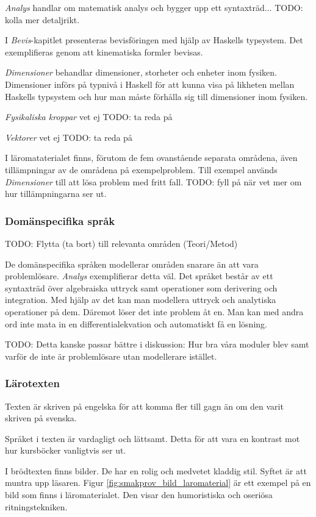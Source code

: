 \begin{binge}
\textit{Analys} handlar om matematisk analys och bygger upp ett syntaxträd...
TODO: kolla mer detaljrikt.

I \textit{Bevis}-kapitlet presenteras bevisföringen med hjälp av Haskells
typsystem. Det exemplifieras genom att kinematiska formler bevisas.

\textit{Dimensioner} behandlar dimensioner, storheter och enheter inom fysiken.
Dimensioner införs på typnivå i Haskell för att kunna visa på likheten mellan
Haskells typsystem och hur man måste förhålla sig till dimensioner inom
fysiken.

\textit{Fysikaliska kroppar} vet ej TODO: ta reda på

\textit{Vektorer} vet ej TODO: ta reda på

I läromataterialet finns, förutom de fem ovanstående separata områdena, även tillämpningar av de områdena på exempelproblem. Till exempel används \textit{Dimensioner} till att lösa problem med fritt fall. TODO: fyll på när vet mer om hur tillämpningarna ser ut.

\subsubsection{Domänspecifika språk}
TODO: Flytta (ta bort) till relevanta områden (Teori/Metod)

De domänspecifika språken modellerar områden snarare än att vara problemlösare.
\textit{Analys} exemplifierar detta väl. Det språket består av ett syntaxträd
över algebraiska uttryck samt operationer som derivering och integration. Med
hjälp av det kan man modellera uttryck och analytiska operationer på dem.
Däremot löser det inte problem åt en. Man kan med andra ord inte mata in en
differentialekvation och automatiskt få en lösning.

TODO: Detta kanske passar bättre i diskussion: Hur bra våra moduler blev samt varför de inte är problemlösare utan modellerare istället.

\subsubsection{Lärotexten}

Texten är skriven på engelska för att komma fler till gagn än om den varit
skriven på svenska.

Språket i texten är vardagligt och lättsamt. Detta för att vara en kontrast mot
hur kursböcker vanligtvis ser ut.

I brödtexten finns bilder. De har en rolig och medvetet kladdig stil. Syftet är
att muntra upp läsaren. Figur \ref{fig:smakprov_bild_laromaterial} är ett
exempel på en bild som finns i läromaterialet. Den visar den humoristiska och
oseriösa ritningstekniken.


\end{binge}
